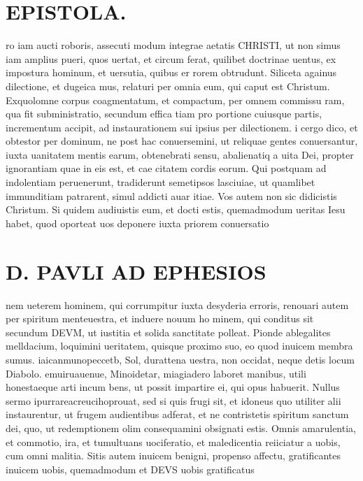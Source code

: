 \documentclass{article}
\begin{document}
\begin{pages}
\section*{EPISTOLA. }
\marginpar{[ p.1 ]}
\marginpar{[ p.r. ]}
\marginpar{[ p.„ ]}
\marginpar{[ p.7.  ]}\pstart ro iam aucti roboris, assecuti modum integrae aetatis CHRISTI, ut non simus iam amplius pueri, quos uertat, et circum ferat, quilibet doctrinae uentus, ex impostura hominum, et uersutia, quibus er rorem obtrudunt.  \pend\pstart Siliceta againus dilectione, et dugeica mus, relaturi per omnia eum, qui caput est Christum. Exquolomne corpus coagmentatum, et compactum, per omnem commissu ram, qua fit subministratio, secundum effica tiam pro portione cuiusque partis, incrementum accipit, ad instaurationem sui ipsius per dilectionem.  \pend\pstart i cergo dico, et obtestor per dominum, ne post hac conuersemini, ut reliquae gentes conuersantur, iuxta uanitatem mentis earum, obtenebrati sensu, abalienatiq a uita Dei, propter ignorantiam quae in eis est, et cae citatem cordis eorum. Qui postquam ad indolentiam peruenerunt, tradiderunt semetipsos lasciuiae, ut quamlibet immunditiam patrarent, simul addicti auar itiae.  \pend\pstart Vos autem non sic didicistis Christum. Si quidem audiuistis eum, et docti estis, quemadmodum ueritas Iesu habet, quod oporteat uos deponere iuxta priorem conuersatio\pend
\section*{D. PAVLI AD EPHESIOS }
\marginpar{[ p.8. ]}
\marginpar{[ p.9.  ]}
\marginpar{[ p.10.  ]}
\marginpar{[ p.11.  ]}
\marginpar{[ p.12.  ]}
\marginpar{[ p.13.  ]}\pstart nem ueterem hominem, qui corrumpitur iuxta desyderia erroris, renouari autem per spiritum menteuestra, et induere nouum ho minem, qui conditus sit secundum DEVM, ut iustitia et solida sanctitate polleat.  \pend\pstart Pionde ablegalites melldacium, loquimini ueritatem, quisque proximo suo, eo quod inuicem membra sumus.  \pend\pstart iaicanmunopeccetb, Sol, durattena uestra, non occidat, neque detis locum Diabolo.  \pend\pstart emuiruauenue, Minoidetar, miagiadero laboret manibus, utili honestaeque arti incum bens, ut possit impartire ei, qui opus habuerit.  \pend\pstart Nullus sermo ipurrareacreucihoprouat, sed si quis frugi sit, et idoneus quo utiliter alii instaurentur, ut frugem audientibus adferat, et ne contristetis spiritum sanctum dei, quo, ut redemptionem olim consequamini obsignati estis.  \pend\pstart Omnis amarulentia, et commotio,  ira, et tumultuans uociferatio, et maledicentia reiiciatur a uobis, cum omni malitia.  \pend\pstart Sitis autem inuicem benigni, propenso affectu, gratificantes inuicem uobis, quemadmodum et DEVS uobis gratificatus  \pend

\end{pages}
\end{document}
